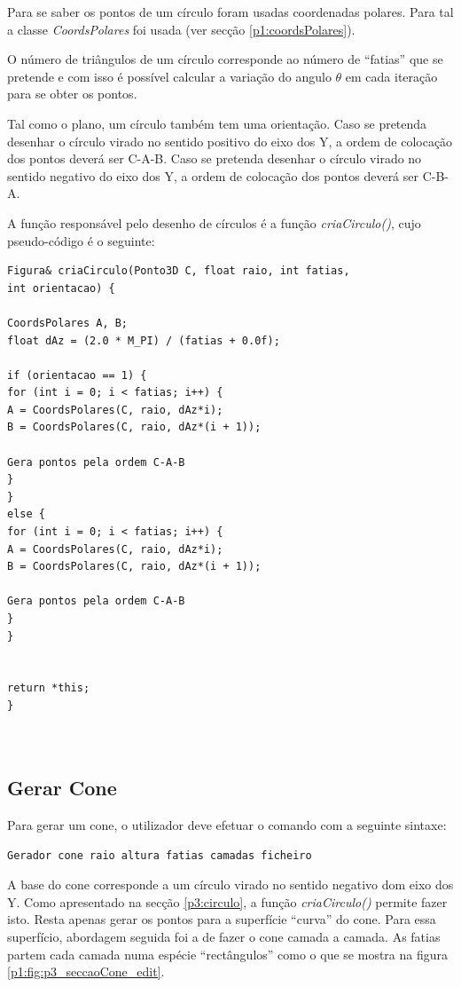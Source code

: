 Para se saber os pontos de um círculo foram usadas coordenadas polares. Para tal a classe \textit{CoordsPolares} foi usada (ver secção \ref{p1:coordsPolares}).

O número de triângulos de um círculo corresponde ao número de ``fatias'' que se pretende e com isso é possível calcular a variação do angulo $\theta$ em cada iteração para se obter os pontos.

Tal como o plano, um círculo também tem uma orientação. Caso se pretenda desenhar o círculo virado no sentido positivo do eixo dos Y, a ordem de colocação dos pontos deverá ser C-A-B. Caso se pretenda desenhar o círculo virado no sentido negativo do eixo dos Y, a ordem de colocação dos pontos deverá ser C-B-A.

A função responsável pelo desenho de círculos é a função \textit{criaCirculo()}, cujo pseudo-código é o seguinte:

\begin{Verbatim}
Figura& criaCirculo(Ponto3D C, float raio, int fatias, 
int orientacao) {

CoordsPolares A, B;
float dAz = (2.0 * M_PI) / (fatias + 0.0f);

if (orientacao == 1) {
for (int i = 0; i < fatias; i++) {
A = CoordsPolares(C, raio, dAz*i);
B = CoordsPolares(C, raio, dAz*(i + 1));

Gera pontos pela ordem C-A-B
}
}
else {
for (int i = 0; i < fatias; i++) {
A = CoordsPolares(C, raio, dAz*i);
B = CoordsPolares(C, raio, dAz*(i + 1));

Gera pontos pela ordem C-A-B
}
}


return *this;
}



\end{Verbatim}

\newpage
\subsection{Gerar Cone}

Para gerar um cone, o utilizador deve efetuar o comando com a seguinte sintaxe:

\begin{Verbatim}
Gerador cone raio altura fatias camadas ficheiro
\end{Verbatim}

A base do cone corresponde a um círculo virado no sentido negativo dom eixo dos Y. Como apresentado na secção \ref{p3:circulo}, a função \textit{criaCirculo()} permite fazer isto. Resta apenas gerar os pontos para a superfície ``curva'' do cone. Para essa superfício, abordagem seguida foi a de fazer o cone camada a camada. As fatias partem cada camada numa espécie ``rectângulos'' como o que se mostra na figura \ref{p1:fig:p3_seccaoCone_edit}.


